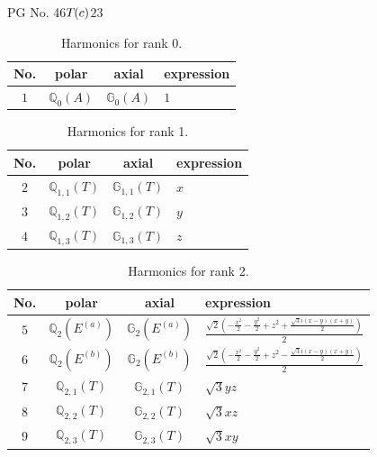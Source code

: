 \documentclass[fleqn,8pt,landscape]{jsarticle}
\begin{document}
\setcounter{MaxMatrixCols}{32}

\renewcommand{\tablename}{Table~}
\renewcommand{\figurename}{Figure~}
\begin{center}
\LARGE
PG No. 46\quad$T_{\rm }(c)$\quad$23$\quad[ cubic ]
\end{center}
\begin{table}[ht!]
\begin{center}
\caption{Harmonics for rank 0.}
\renewcommand{\arraystretch}{1.3}
\begin{tabular}{cccl} \hline \hline
No. & polar & axial & expression \\ \hline
$ 1 $ & $ \mathbb{Q}_{0}(A) $ & $ \mathbb{G}_{0}(A) $ & $ 1 $ \\
 \hline \hline
\end{tabular}
\end{center}
\end{table}
\begin{table}[ht!]
\begin{center}
\caption{Harmonics for rank 1.}
\renewcommand{\arraystretch}{1.3}
\begin{tabular}{cccl} \hline \hline
No. & polar & axial & expression \\ \hline
$ 2 $ & $ \mathbb{Q}_{1,1}(T) $ & $ \mathbb{G}_{1,1}(T) $ & $ x $ \\
$ 3 $ & $ \mathbb{Q}_{1,2}(T) $ & $ \mathbb{G}_{1,2}(T) $ & $ y $ \\
$ 4 $ & $ \mathbb{Q}_{1,3}(T) $ & $ \mathbb{G}_{1,3}(T) $ & $ z $ \\
 \hline \hline
\end{tabular}
\end{center}
\end{table}
\begin{table}[ht!]
\begin{center}
\caption{Harmonics for rank 2.}
\renewcommand{\arraystretch}{1.3}
\begin{tabular}{cccl} \hline \hline
No. & polar & axial & expression \\ \hline
$ 5 $ & $ \mathbb{Q}_{2}(E^{(a)}) $ & $ \mathbb{G}_{2}(E^{(a)}) $ & $ \frac{\sqrt{2} \left(- \frac{x^{2}}{2} - \frac{y^{2}}{2} + z^{2} + \frac{\sqrt{3} i \left(x - y\right) \left(x + y\right)}{2}\right)}{2} $ \\
$ 6 $ & $ \mathbb{Q}_{2}(E^{(b)}) $ & $ \mathbb{G}_{2}(E^{(b)}) $ & $ \frac{\sqrt{2} \left(- \frac{x^{2}}{2} - \frac{y^{2}}{2} + z^{2} - \frac{\sqrt{3} i \left(x - y\right) \left(x + y\right)}{2}\right)}{2} $ \\
$ 7 $ & $ \mathbb{Q}_{2,1}(T) $ & $ \mathbb{G}_{2,1}(T) $ & $ \sqrt{3} y z $ \\
$ 8 $ & $ \mathbb{Q}_{2,2}(T) $ & $ \mathbb{G}_{2,2}(T) $ & $ \sqrt{3} x z $ \\
$ 9 $ & $ \mathbb{Q}_{2,3}(T) $ & $ \mathbb{G}_{2,3}(T) $ & $ \sqrt{3} x y $ \\
 \hline \hline
\end{tabular}
\end{center}
\end{table}
\end{document}
